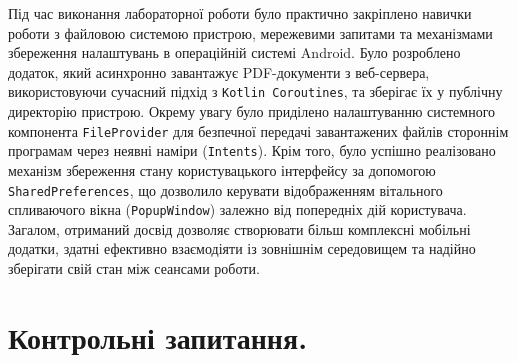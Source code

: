 \documentclass[14pt, a4paper]{extreport}
\begin{document}
	Під час виконання лабораторної роботи було практично закріплено навички роботи з файловою системою пристрою, мережевими запитами та механізмами збереження налаштувань в операційній системі Android. Було розроблено додаток, який асинхронно завантажує PDF-документи з веб-сервера, використовуючи сучасний підхід з \texttt{Kotlin Coroutines}, та зберігає їх у публічну директорію пристрою. Окрему увагу було приділено налаштуванню системного компонента \texttt{FileProvider} для безпечної передачі завантажених файлів стороннім програмам через неявні наміри (\texttt{Intents}). Крім того, було успішно реалізовано механізм збереження стану користувацького інтерфейсу за допомогою \texttt{SharedPreferences}, що дозволило керувати відображенням вітального спливаючого вікна (\texttt{PopupWindow}) залежно від попередніх дій користувача. Загалом, отриманий досвід дозволяє створювати більш комплексні мобільні додатки, здатні ефективно взаємодіяти із зовнішнім середовищем та надійно зберігати свій стан між сеансами роботи.
	
	\section*{Контрольні запитання.}
	
\end{document}

